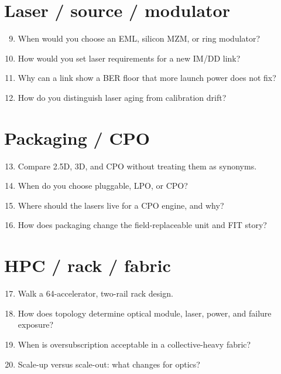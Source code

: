\section{Laser / source / modulator}

\begin{enumerate}
\setcounter{enumi}{8}
\item When would you choose an EML, silicon MZM, or ring modulator?
      \hfill {}
\item How would you set laser requirements for a new IM/DD link?
      \hfill {}
\item Why can a link show a BER floor that more launch power does not fix?
      \hfill {}
\item How do you distinguish laser aging from calibration drift?
      \hfill {}
\end{enumerate}

\section{Packaging / CPO}

\begin{enumerate}
\setcounter{enumi}{12}
\item Compare 2.5D, 3D, and CPO without treating them as synonyms.
      \hfill {}
\item When do you choose pluggable, LPO, or CPO?
      \hfill {}
\item Where should the lasers live for a CPO engine, and why?
      \hfill {}
\item How does packaging change the field-replaceable unit and FIT story?
      \hfill {}
\end{enumerate}

\section{HPC / rack / fabric}

\begin{enumerate}
\setcounter{enumi}{16}
\item Walk a 64-accelerator, two-rail rack design.
      \hfill {}
\item How does topology determine optical module, laser, power, and failure
      exposure? \hfill {}
\item When is oversubscription acceptable in a collective-heavy fabric?
      \hfill {}
\item Scale-up versus scale-out: what changes for optics?
      \hfill {}
\end{enumerate}

